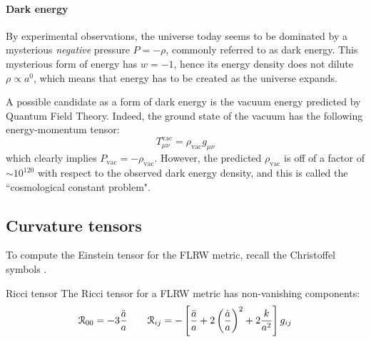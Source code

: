 \paragraph{Dark energy}

By experimental observations, the universe today seems to be dominated by a mysterious \emph{negative} pressure $ P = - \rho $, commonly referred to as dark energy. This mysterious form of energy has $ w = -1 $, hence its energy density does not dilute $ \rho \propto a^0 $, which means that energy has to be created as the universe expands\footnotemark.


A possible candidate as a form of dark energy is the vacuum energy predicted by Quantum Field Theory. Indeed, the ground state of the vacuum has the following energy-momentum tensor:
\begin{equation*}
  T^\text{vac}_{\mu \nu} = \rho_\text{vac} g_{\mu \nu}
\end{equation*}
which clearly implies $ P_\text{vac} = - \rho_\text{vac} $. However, the predicted $ \rho_\text{vac} $ is off of a factor of $ \sim 10^{120} $ with respect to the observed dark energy density, and this is called the ``cosmological constant problem".

\subsection{Curvature tensors}

To compute the Einstein tensor for the FLRW metric, recall the Christoffel symbols .

\begin{proposition}{Ricci tensor}{}
  The Ricci tensor for a FLRW metric has non-vanishing components:
  \begin{equation}
    \EuScript{R}_{00} = - 3 \frac{\ddot{a}}{a}
    \qquad
    \EuScript{R}_{ij} = - \left[ \frac{\ddot{a}}{a} + 2 \left( \frac{\dot{a}}{a} \right)^2 + 2 \frac{k}{a^2} \right] g_{ij}
  \end{equation}
\end{proposition}


